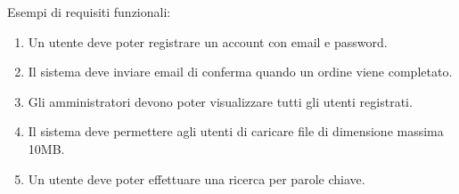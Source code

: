 Esempi di requisiti funzionali:
\begin{enumerate}
    \item Un utente deve poter registrare un account con email e password.
    \item Il sistema deve inviare email di conferma quando un ordine viene completato.
    \item Gli amministratori devono poter visualizzare tutti gli utenti registrati.
    \item Il sistema deve permettere agli utenti di caricare file di dimensione massima 10MB.
    \item Un utente deve poter effettuare una ricerca per parole chiave.
\end{enumerate}
